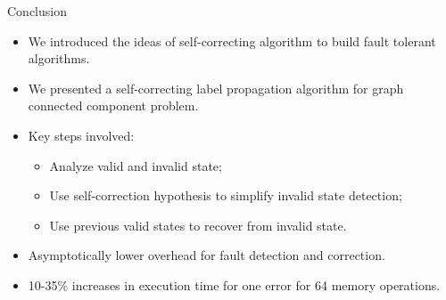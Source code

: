 \begin{block}{Conclusion}
\begin{itemize}
\item We introduced the ideas of self-correcting algorithm to build fault tolerant algorithms. 
	
\item We presented a self-correcting label propagation algorithm for graph connected component problem.
\item Key steps involved:
	\begin{itemize}
	\item Analyze valid and invalid state;
	\item Use self-correction hypothesis to simplify invalid state detection;
	\item Use previous valid states to recover from invalid state. 
	\end{itemize}

	
\item Asymptotically lower overhead for fault detection and correction. 
\item 10-35\%  increases in execution time for one error for 64 memory operations.

	
\end{itemize}
\end{block}



\lyxframeend{}

